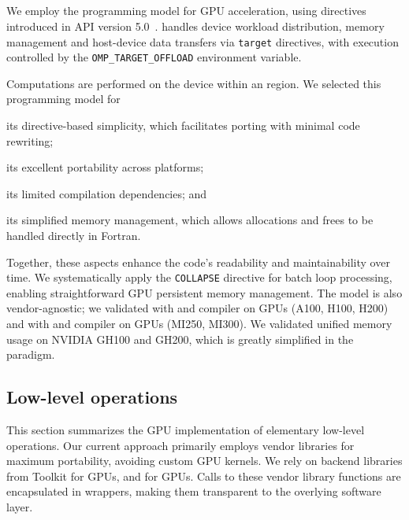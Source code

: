 \documentclass[twocolumn,superscriptaddress]{revtex4-1}
\begin{document}
\subsection{\openmpoffload}

We employ the \openmpoffload programming model for GPU acceleration, using directives introduced in \openmp API version 5.0~\cite{OpenMP5.0}. \openmp handles device workload distribution, memory management and host-device data transfers via \texttt{target} directives,  with execution controlled by the
\texttt{OMP\_TARGET\_OFFLOAD} environment variable.

Computations are performed on the device within an \openmptarget region. We selected this programming model for \begin{enumerate*}[label=(\roman*)]
\item its directive-based simplicity, which facilitates porting with minimal code rewriting; \item its excellent portability across platforms; \item its limited compilation dependencies; and \item its simplified memory management, which allows allocations and frees to be handled directly in Fortran. \end{enumerate*} Together, these aspects enhance the code's readability and maintainability over time. We systematically apply the \texttt{COLLAPSE} directive for batch loop processing, enabling straightforward GPU persistent memory management. The model is also vendor-agnostic; we validated \openmptarget with \cuda and \nvhpc compiler on \nvidia GPUs (A100, H100, H200) and with \rocm and \cray compiler on \amd GPUs (MI250, MI300). We validated unified memory usage on NVIDIA GH100 and GH200, which is greatly simplified in the \openmptarget paradigm. 

\subsection{Low-level operations}\label{sec:lowlevelops}

This section summarizes the GPU implementation of elementary low-level operations. Our current approach primarily employs vendor libraries for maximum portability, avoiding custom GPU kernels. We rely on backend libraries from \cuda Toolkit \cite{cuda_manual} for \nvidia GPUs, and \rocm \cite{rocm_manual} for \amd GPUs. Calls to these vendor library functions are encapsulated in wrappers, making them transparent to the overlying software layer. 
\end{document}
